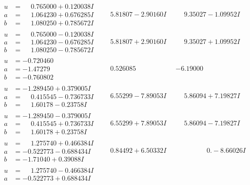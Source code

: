 \documentclass[1p]{elsarticle_modified}
\theoremstyle{definition}
\begin{document}
$$\begin{array}{c|c|c}
\begin{aligned}
u &= \phantom{-}0.765000 + 0.120038 I \\
a &= \phantom{-}1.064230 + 0.676285 I \\
b &= \phantom{-}1.080250 + 0.785672 I\end{aligned}
 & \phantom{-}5.81807 - 2.90160 I & \phantom{-}9.35027 - 1.09952 I \\ \hline\begin{aligned}
u &= \phantom{-}0.765000 - 0.120038 I \\
a &= \phantom{-}1.064230 - 0.676285 I \\
b &= \phantom{-}1.080250 - 0.785672 I\end{aligned}
 & \phantom{-}5.81807 + 2.90160 I & \phantom{-}9.35027 + 1.09952 I \\ \hline\begin{aligned}
u &= -0.720460\phantom{ +0.000000I} \\
a &= -1.47279\phantom{ +0.000000I} \\
b &= -0.760802\phantom{ +0.000000I}\end{aligned}
 & \phantom{-}0.526085\phantom{ +0.000000I} & -6.19000\phantom{ +0.000000I} \\ \hline\begin{aligned}
u &= -1.289450 + 0.379005 I \\
a &= \phantom{-}0.415545 - 0.736733 I \\
b &= \phantom{-}1.60178 - 0.23758 I\end{aligned}
 & \phantom{-}6.55299 - 7.89053 I & \phantom{-}5.86094 + 7.19827 I \\ \hline\begin{aligned}
u &= -1.289450 - 0.379005 I \\
a &= \phantom{-}0.415545 + 0.736733 I \\
b &= \phantom{-}1.60178 + 0.23758 I\end{aligned}
 & \phantom{-}6.55299 + 7.89053 I & \phantom{-}5.86094 - 7.19827 I \\ \hline\begin{aligned}
u &= \phantom{-}1.275740 + 0.466384 I \\
a &= -0.522773 - 0.688434 I \\
b &= -1.71040 + 0.39088 I\end{aligned}
 & \phantom{-}0.84492 + 6.50332 I & \phantom{-0.000000 } 0. - 8.66026 I \\ \hline\begin{aligned}
u &= \phantom{-}1.275740 - 0.466384 I \\
a &= -0.522773 + 0.688434 I \\

\end{aligned}
\end{array}$$
\end{document}
